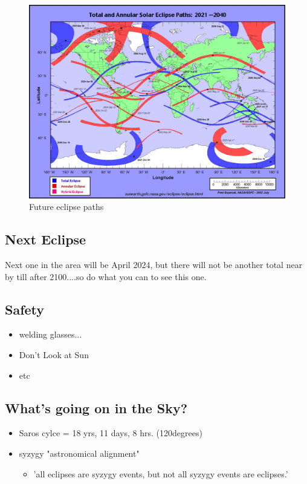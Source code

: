 \documentclass{article}
\begin{document}
\begin{figure}
\includegraphics[scale=1]{Pictures/SEatlas2021.jpg}
\caption{Future eclipse paths}
\end{figure}

\subsection{Next Eclipse}
Next one in the area will be April 2024, but there will not be another total near by till after 2100....so do what you can to see this one.

\subsection{Safety}
\begin{itemize}
\item welding glasses...
\item Don't Look at Sun
\item etc
\end{itemize}

\subsection{What's going on in the Sky?}
\begin{itemize}
\item Saros cylce = 18 yrs, 11 days, 8 hrs.  (120degrees)
\item syzygy  "astronomical alignment"
	\begin{itemize}
\item 'all eclipses are syzygy events, but not all syzygy events are eclipses.'
	\end{itemize}
\end{itemize}

\end{document}
